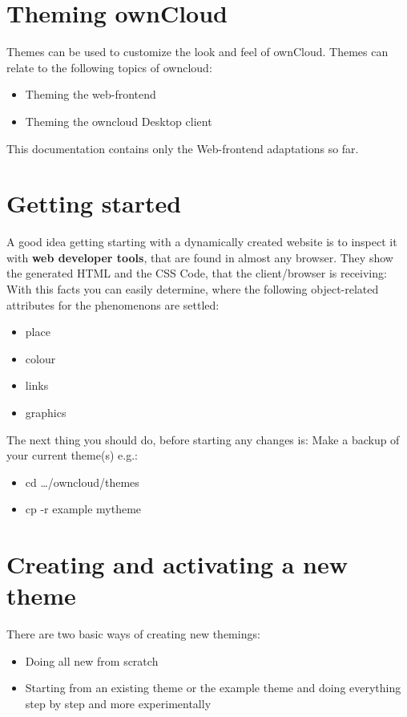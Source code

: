 \documentclass[letterpaper,10pt,english]{sphinxmanual}
\begin{document}
\section{Theming ownCloud}
\label{core/theming:theming-owncloud}\label{core/theming::doc}
Themes can be used to customize the look and feel of ownCloud.
Themes can relate to the following topics of owncloud:
\begin{itemize}
\item {} 
Theming the web-frontend

\item {} 
Theming the owncloud Desktop client

\end{itemize}

This documentation contains only the Web-frontend adaptations so far.


\section{Getting started}
\label{core/theming:getting-started}
A good idea getting starting with a dynamically created website is to inspect it with \textbf{web developer tools}, that are found in almost any browser. They show the generated HTML and the CSS Code, that the client/browser is receiving:
With this facts you can easily determine, where the following object-related attributes for the phenomenons are settled:
\begin{itemize}
\item {} 
place

\item {} 
colour

\item {} 
links

\item {} 
graphics

\end{itemize}

The next thing you should do, before starting any changes is:
Make a backup of your current theme(s) e.g.:
\begin{itemize}
\item {} 
cd …/owncloud/themes

\item {} 
cp -r example mytheme

\end{itemize}


\section{Creating and activating a new theme}
\label{core/theming:creating-and-activating-a-new-theme}
There are two basic ways of creating new themings:
\begin{itemize}
\item {} 
Doing all new from scratch

\item {} 
Starting from an existing theme or the example theme and doing everything step by step and more experimentally

\end{itemize}
\end{document}
